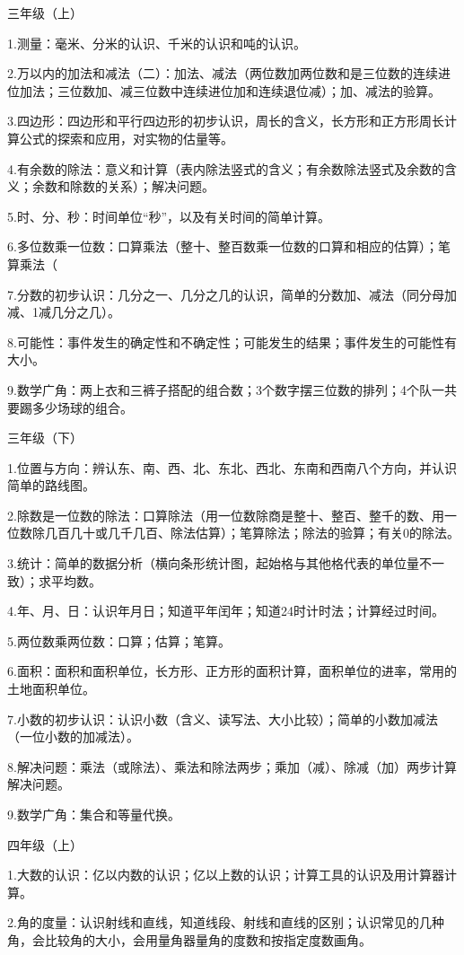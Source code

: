 三年级（上）

1.测量：毫米、分米的认识、千米的认识和吨的认识。

2.万以内的加法和减法（二）：加法、减法（两位数加两位数和是三位数的连续进位加法；三位数加、减三位数中连续进位加和连续退位减）；加、减法的验算。

3.四边形：四边形和平行四边形的初步认识，周长的含义，长方形和正方形周长计算公式的探索和应用，对实物的估量等。

4.有余数的除法：意义和计算（表内除法竖式的含义；有余数除法竖式及余数的含义；余数和除数的关系）；解决问题。

5.时、分、秒：时间单位“秒”，以及有关时间的简单计算。

6.多位数乘一位数：口算乘法（整十、整百数乘一位数的口算和相应的估算）；笔算乘法（

7.分数的初步认识：几分之一、几分之几的认识，简单的分数加、减法（同分母加减、1减几分之几）。

8.可能性：事件发生的确定性和不确定性；可能发生的结果；事件发生的可能性有大小。

9.数学广角：两上衣和三裤子搭配的组合数；3个数字摆三位数的排列；4个队一共要踢多少场球的组合。

三年级（下）

1.位置与方向：辨认东、南、西、北、东北、西北、东南和西南八个方向，并认识简单的路线图。

2.除数是一位数的除法：口算除法（用一位数除商是整十、整百、整千的数、用一位数除几百几十或几千几百、除法估算）；笔算除法；除法的验算；有关0的除法。

3.统计：简单的数据分析（横向条形统计图，起始格与其他格代表的单位量不一致）；求平均数。

4.年、月、日：认识年月日；知道平年闰年；知道24时计时法；计算经过时间。

5.两位数乘两位数：口算；估算；笔算。

6.面积：面积和面积单位，长方形、正方形的面积计算，面积单位的进率，常用的土地面积单位。

7.小数的初步认识：认识小数（含义、读写法、大小比较）；简单的小数加减法（一位小数的加减法）。

8.解决问题：乘法（或除法）、乘法和除法两步；乘加（减）、除减（加）两步计算解决问题。

9.数学广角：集合和等量代换。

四年级（上）

1.大数的认识：亿以内数的认识；亿以上数的认识；计算工具的认识及用计算器计算。

2.角的度量：认识射线和直线，知道线段、射线和直线的区别；认识常见的几种角，会比较角的大小，会用量角器量角的度数和按指定度数画角。

